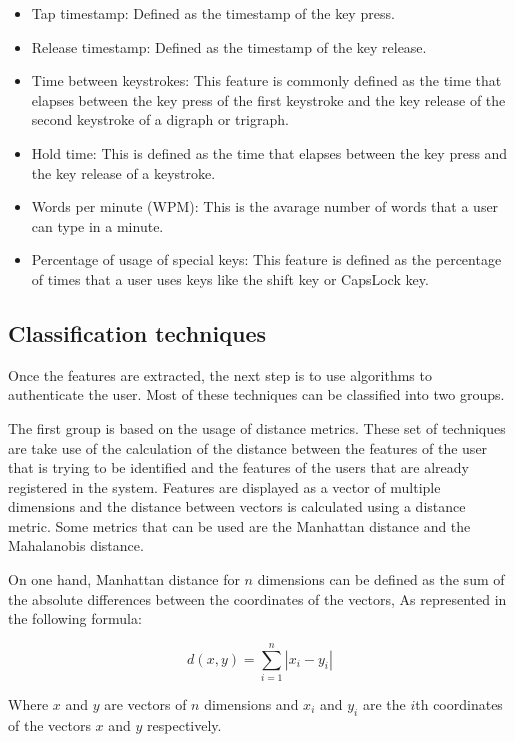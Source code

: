 \begin{itemize}
	\item Tap timestamp: Defined as the timestamp of the key press.
	\item Release timestamp: Defined as the timestamp of the key release.
	\item Time between keystrokes: This feature is commonly defined as the time that elapses between the key press of the first keystroke and the key release of the second keystroke of a digraph or trigraph.
	\item Hold time: This is defined as the time that elapses between the key press and the key release of a keystroke.
	\item Words per minute (WPM): This is the avarage number of words that a user can type in a minute.
	\item Percentage of usage of special keys: This feature is defined as the percentage of times that a user uses keys like the shift key or CapsLock key.
\end{itemize}

\subsection{Classification techniques}

Once the features are extracted, the next step is to use algorithms to authenticate the user. Most of these techniques can be classified into two groups.


The first group is based on the usage of distance metrics. These set of techniques are take use of the calculation of the distance between the features of the user that is trying to be identified and the features of the users that are already registered in the system. Features are displayed as a vector of multiple dimensions and the distance between vectors is calculated using a distance metric. Some metrics that can be used are the Manhattan distance and the Mahalanobis distance.

On one hand, Manhattan distance for $n$ dimensions can be defined as the sum of the absolute differences between the coordinates of the vectors, As represented in the following formula:

\begin{equation}
	d(x,y) = \sum_{i=1}^{n} |x_i - y_i|
\end{equation}

Where $x$ and $y$ are vectors of $n$ dimensions and $x_i$ and $y_i$ are the $i$th coordinates of the vectors $x$ and $y$ respectively.

